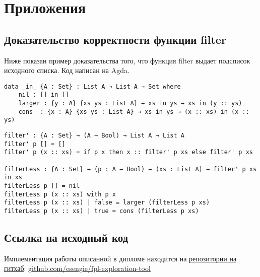 \appendix
\section*{Приложения}
\renewcommand{\thesubsection}{\Alph{subsection}}

\subsection{Доказательство корректности функции filter}\label{sort_proof}

Ниже показан пример доказательства того, что функция filter выдает подсписок исходного списка.
Код написан на Agda\cite{agda}.

\begin{lstlisting}[caption={Определяем предикат означающий "список xs является подсписком ys"},captionpos=b, frame=single]
data _in_ {A : Set} : List A → List A → Set where
    nil : [] in []
    larger : {y : A} {xs ys : List A} → xs in ys → xs in (y :: ys)
    cons  : {x : A} {xs ys : List A} → xs in ys → (x :: xs) in (x :: ys)
\end{lstlisting}


\begin{lstlisting}[caption={Докажем, что filter xs подсписок xs для любого списка xs},captionpos=b, frame=single]
filter' : {A : Set} → (A → Bool) → List A → List A
filter' p [] = []
filter' p (x :: xs) = if p x then x :: filter' p xs else filter' p xs

filterLess : {A : Set} → (p : A → Bool) → (xs : List A) → filter' p xs in xs
filterLess p [] = nil
filterLess p (x :: xs) with p x
filterLess p (x :: xs) | false = larger (filterLess p xs)
filterLess p (x :: xs) | true = cons (filterLess p xs)
\end{lstlisting}


\subsection{Ссылка на исходный код}\label{source_code}
Имплементация работы описанной в дипломе находится на \href{https://github.com/esengie/fpl-exploration-tool}{репозитории на гитхаб}: \url{github.com/esengie/fpl-exploration-tool}

